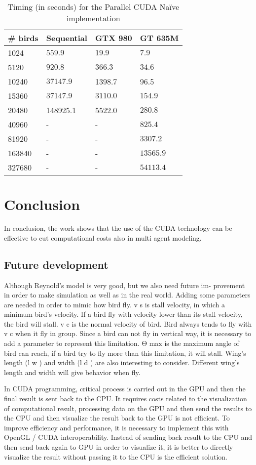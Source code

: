 \begin{table}
	\centering
	\begin{tabular}{|l |l |l| l|}
	\hline
	\# birds & Sequential & GTX 980 & GT
	635M
	\\
	\hline
	
	1024  & \(559.9\) & $19.9$ & $7.9$ \\
	5120  & \(920.8\) & $366.3$ & $34.6$ \\
	10240 &  $37147.9$ & 1398.7 & 96.5 \\
	15360  & \(37147.9\) & $3110.0$ & $154.9$ \\
	20480  & 148925.1 & 5522.0 & $280.8$ \\
	40960  & - & - & $825.4$ \\
	81920  & - & - & $3307.2$ \\
	163840  & - & - & $13565.9$ \\
	327680  & - & - & $54113.4$ \\
	\hline
	\end{tabular}
	\caption{Timing (in seconds) for the Parallel CUDA Na\"ive implementation}
	\label{tab:ifdiv}
\end{table}


\section{Conclusion}
In conclusion, the work shows that the use of the CUDA
technology can be effective to cut computational costs also in multi agent
modeling.

\subsection{Future development}
Although Reynold’s model is very good, but we also need future im-
provement in order to make simulation as well as in the real world.
Adding some parameters are needed in order to mimic how bird fly.
v s is stall velocity, in which a minimum bird’s velocity. If a bird fly
with velocity lower than its stall velocity, the bird will stall. v c is the
normal velocity of bird. Bird always tends to fly with v c when it fly in
group. Since a bird can not fly in vertical way, it is necessary to add
a parameter to represent this limitation. Θ max is the maximum angle
of bird can reach, if a bird try to fly more than this limitation, it will
stall. Wing’s length (l w ) and width (l d ) are also interesting to consider.
Different wing’s length and width will give behavior when fly.

In CUDA programming, critical process is carried out in the GPU and
then the final result is sent back to the CPU. It requires costs related to
the visualization of computational result, processing data on the GPU
and then send the results to the CPU and then visualize the result back
to the GPU is not efficient. To improve efficiency and performance, it
is necessary to implement this with OpenGL / CUDA interoperability.
Instead of sending back result to the CPU and then send back again to
GPU in order to visualize it, it is better to directly visualize the result
without passing it to the CPU is the efficient solution.
